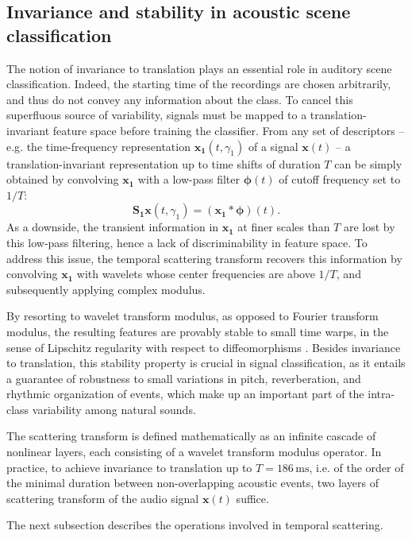 \documentclass[journal]{IEEEtran}
\makeatletter
\newcommand*{\eg}{e.g.\@\xspace}
\newcommand*{\ie}{i.e.\@\xspace}
\makeatother
\begin{document}
\subsection{Invariance and stability in acoustic scene classification}
The notion of invariance to translation plays an essential role in auditory scene classification.
Indeed, the starting time of the recordings are chosen arbitrarily, and thus do not convey any information about the class.
To cancel this superfluous source of variability, signals must be mapped to a translation-invariant feature space before training the classifier.
From any set of descriptors -- \eg the time-frequency representation $\boldsymbol{x_1}(t,\gamma_1)$ of  a signal $\boldsymbol{x}(t)$ --
a translation-invariant representation up to time shifts of duration $T$ can be simply obtained
by convolving $\boldsymbol{x_1}$ with a low-pass filter $\boldsymbol{\phi}(t)$ of cutoff frequency
set to $1/T$:
\begin{equation}
\mathbf{S_1}\boldsymbol{x}(t, \gamma_1) = (\boldsymbol{x_1} \ast \boldsymbol{\phi}) (t).
\end{equation}
As a downside, the transient information in $\boldsymbol{x_1}$ at finer scales than $T$ are lost by this low-pass filtering, hence a lack of discriminability in feature space.
To address this issue, the temporal scattering transform recovers this information by convolving $\boldsymbol{x_1}$ with wavelets whose center frequencies are above $1/T$, and subsequently applying complex modulus.

By resorting to wavelet transform modulus, as opposed to Fourier transform modulus, the resulting features are provably stable to small time warps,
in the sense of Lipschitz regularity with respect to diffeomorphisms \cite{Mallat2012}.
Besides invariance to translation, this stability property is crucial in signal classification, as it entails a guarantee of robustness to small variations in pitch, reverberation, and rhythmic organization of events, which make up an important part of the intra-class variability among natural sounds.

The scattering transform is defined mathematically as an infinite cascade of nonlinear layers, each consisting of a wavelet transform modulus operator.
In practice, to achieve invariance to translation up to $T = 186\,\mathrm{ms}$, \ie of the order of the minimal duration between non-overlapping acoustic events, two layers of scattering transform of the audio signal $\boldsymbol{x}(t)$ suffice.

The next subsection describes the operations involved in temporal scattering.
\end{document}
